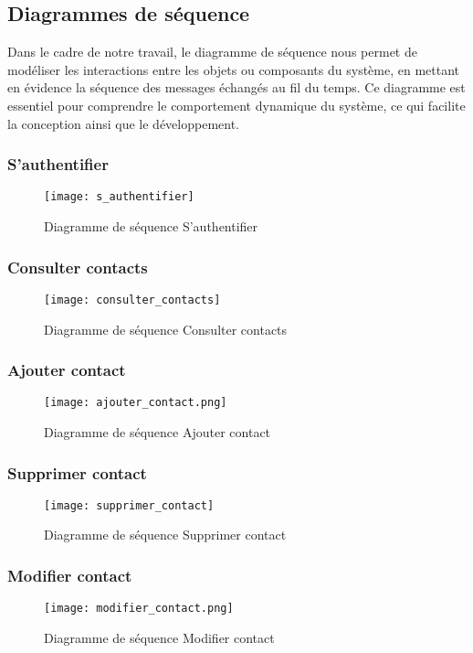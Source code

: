 \subsection{Diagrammes de séquence}

Dans le cadre de notre travail, le diagramme de séquence nous permet de modéliser les interactions entre les objets ou composants du système, en mettant en évidence la séquence des messages échangés au fil du temps. Ce diagramme est essentiel pour comprendre le comportement dynamique du système, ce qui facilite la conception ainsi que le développement.

\subsubsection{S'authentifier}
\begin{figure}[H]
	\texttt{[image: s\_authentifier]}
	\caption{Diagramme de séquence S’authentifier}
\end{figure}

\subsubsection{Consulter contacts}
\begin{figure}[H]
	\texttt{[image: consulter\_contacts]}
	\caption{Diagramme de séquence Consulter contacts}
\end{figure}

\subsubsection{Ajouter contact}
\begin{figure}[H]
	\texttt{[image: ajouter\_contact.png]}
	\caption{Diagramme de séquence Ajouter contact}
\end{figure}

\subsubsection{Supprimer contact}
\begin{figure}[H]
	\texttt{[image: supprimer\_contact]}
	\caption{Diagramme de séquence Supprimer contact}
\end{figure}

\subsubsection{Modifier contact}
\begin{figure}[H]
	\texttt{[image: modifier\_contact.png]}
	\caption{Diagramme de séquence Modifier contact}
\end{figure}

